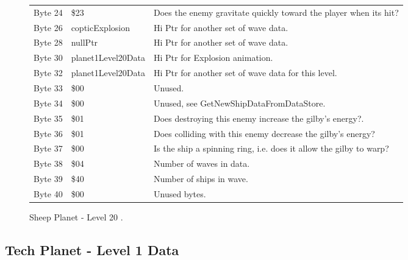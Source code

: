 \begin{figure}[H]
{\begin{adjustbox}{width=12cm}
\begin{tabular}{lll}
 Byte 24 & \$23                & Does the enemy gravitate quickly toward the player when its hit?   \\
 Byte 26 & copticExplosion    & Hi Ptr for another set of wave data.                               \\
 Byte 28 & nullPtr            & Hi Ptr for another set of wave data.                               \\
 Byte 30 & planet1Level20Data & Hi Ptr for Explosion animation.                                    \\
 Byte 32 & planet1Level20Data & Hi Ptr for another set of wave data for this level.                \\
 Byte 33 & \$00                & Unused.                                                            \\
 Byte 34 & \$00                & Unused, see GetNewShipDataFromDataStore.                           \\
 Byte 35 & \$01                & Does destroying this enemy increase the gilby's energy?.           \\
 Byte 36 & \$01                & Does colliding with this enemy decrease the gilby's energy?        \\
 Byte 37 & \$00                & Is the ship a spinning ring, i.e. does it allow the gilby to warp? \\
 Byte 38 & \$04                & Number of waves in data.                                           \\
 Byte 39 & \$40                & Number of ships in wave.                                           \\
 Byte 40 & \$00                & Unused bytes.                                                      \\
\bottomrule
\end{tabular}

  \end{adjustbox}

  }\caption*{Sheep Planet - Level 20
.}
\end{figure}

\clearpage
\subsection{Tech Planet - Level 1 Data}


